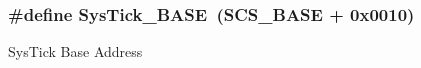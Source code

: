 \subsubsection[{\texorpdfstring{Sys\+Tick\+\_\+\+B\+A\+SE}{SysTick_BASE}}]{\setlength{\rightskip}{0pt plus 5cm}\#define Sys\+Tick\+\_\+\+B\+A\+SE~({\bf S\+C\+S\+\_\+\+B\+A\+SE} +  0x0010)}\hypertarget{group__CMSIS__CM3__core__register_ga58effaac0b93006b756d33209e814646}{}\label{group__CMSIS__CM3__core__register_ga58effaac0b93006b756d33209e814646}
Sys\+Tick Base Address 